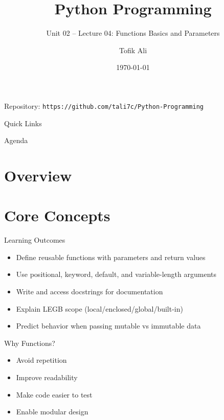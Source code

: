 \documentclass{beamer}
\title[Python Programming]{Python Programming}
\subtitle{Unit 02 -- Lecture 04: Functions Basics and Parameters}
\author{Tofik Ali}
\institute{School of Computer Science, UPES Dehradun}
\date{\today}
\begin{document}
\begin{frame}[fragile]
  \titlepage
  \vspace{0.5em}
  \begin{center}
  \footnotesize Repository: \texttt{https://github.com/tali7c/Python-Programming}
  \end{center}
\end{frame}

\begin{frame}[fragile]{Quick Links}
  \centering
  \hyperlink{sec:core}{}\hspace{1em}
  \hyperlink{sec:demo}{}\hspace{1em}
  \hyperlink{sec:interactive}{}\hspace{1em}
  \hyperlink{sec:summary}{}
\end{frame}

\begin{frame}[fragile]{Agenda}
  \tableofcontents
\end{frame}

\section{Overview}

\section{Core Concepts}
\label{sec:core}

\begin{frame}[fragile]{Learning Outcomes}
  \begin{itemize}[<+->]
    \item Define reusable functions with parameters and return values
    \item Use positional, keyword, default, and variable-length arguments
    \item Write and access docstrings for documentation
    \item Explain LEGB scope (local/enclosed/global/built-in)
    \item Predict behavior when passing mutable vs immutable data
  \end{itemize}
\end{frame}

\begin{frame}[fragile]{Why Functions?}
  \begin{itemize}[<+->]
    \item Avoid repetition
    \item Improve readability
    \item Make code easier to test
    \item Enable modular design
  \end{itemize}
\end{frame}
\end{document}
